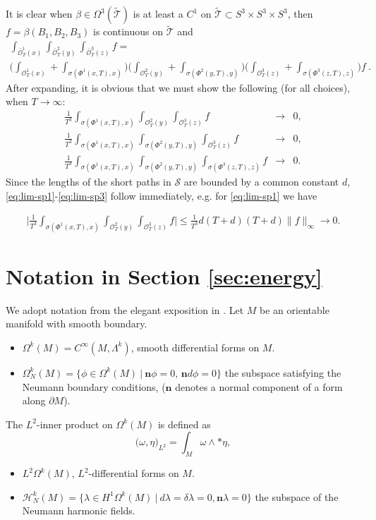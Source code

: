 \documentclass[12pt]{article}
\numberwithin{equation}{section}
\newcommand{\no}{\noindent}
\begin{document}
It is clear when $\beta\in \Omega^3(\widetilde{\mathcal{T}})$ is at least a $C^1$ on
$\widetilde{\mathcal{T}}\subset S^3\times S^3\times S^3$, then
$f=\beta(B_1,B_2,B_3)$ is continuous on $\widetilde{\mathcal{T}}$ and
\begin{gather*}
\int_{\bar{\mathscr{O}}^1_T(x)}\int_{\bar{\mathscr{O}}^2_T(y)}\int_{\bar{\mathscr{O}}^3_T(z)}
f=\\
\bigl(\int_{\mathscr{O}^1_T(x)}+\int_{\sigma(\Phi^1(x,T),x)}\bigr)
\bigl(\int_{\mathscr{O}^2_T(y)}+\int_{\sigma(\Phi^2(y,T),y)}\bigr)
\bigl(\int_{\mathscr{O}^3_T(z)}+\int_{\sigma(\Phi^3(z,T),z)}\bigr)f\ .
\end{gather*}
After expanding, it is obvious that we must show the following (for all choices), when $T\to \infty$:
\begin{eqnarray}\label{eq:lim-sp1}
\frac{1}{T^3}\int_{\sigma(\Phi^1(x,T),x)}\int_{\mathscr{O}^2_{T}(y)}\int_{\mathscr{O}^3_{T}(z)} f & \longrightarrow & 0,\\
\label{eq:lim-sp2}\frac{1}{T^3}\int_{\sigma(\Phi^1(x,T),x)}\int_{\sigma(\Phi^2(y,T),y)}\int_{\mathscr{O}^3_{T}(z)} f & \longrightarrow & 0,\\
\label{eq:lim-sp3}\frac{1}{T^3}\int_{\sigma(\Phi^1(x,T),x)}\int_{\sigma(\Phi^2(y,T),y)}\int_{\sigma(\Phi^3(z,T),z)} f & \longrightarrow & 0.
\end{eqnarray}
Since the lengths of the short paths in $\mathcal{S}$ are bounded by a common constant $d$, \eqref{eq:lim-sp1}-\eqref{eq:lim-sp3} follow immediately, e.g. for \eqref{eq:lim-sp1} we have

\begin{gather*}
\bigl|\frac{1}{T^3}\int_{\sigma(\Phi^1(x,T),x)}\int_{\mathscr{O}^2_{T}(y)}\int_{\mathscr{O}^3_{T}(z)} f\bigr|\leq \frac{1}{T^3} d(T+d)(T+d)\|f\|_{\infty} \longrightarrow  0.
\end{gather*} 


\section{Notation in Section \ref{sec:energy}}\label{apx:C}
 We adopt notation from the elegant exposition in \cite{Schwarz95}. Let $M$ be an orientable manifold with smooth boundary.
\begin{itemize}
\item[] $\Omega^k(M)=C^\infty(M,\Lambda^k)$, smooth differential forms on $M$.
\item[] $\Omega^k_N(M)=\{\phi\in \Omega^k(M)\ |\ \mathbf{n}\phi=0,\, \mathbf{n}d\phi=0\}$ the subspace satisfying the Neumann boundary conditions, ($\mathbf{n}$ denotes a normal component of a form along $\partial M$).
\end{itemize}
\no The $L^2$-inner product on $\Omega^k(M)$ is defined as 
 \[
  \bigl( \omega,\eta\bigr)_{L^2}=\int_M \omega\wedge\ast \eta,
 \] 
\begin{itemize}
\item[] $L^2\Omega^k(M)$, $L^2$-differential forms on $M$.
\item[] $\mathcal{H}^k_N(M)=\{\lambda\in H^1\Omega^k(M)\ |\ d\lambda=\delta\lambda=0, \mathbf{n}\lambda=0\}$ the subspace of the Neumann harmonic fields.
\end{itemize}
\end{document}
